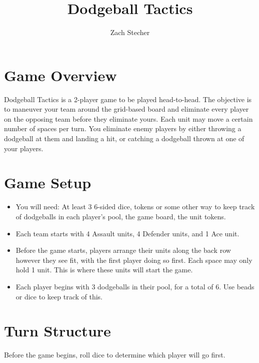 \documentclass[10pt]{article}
\title {Dodgeball Tactics}
\author {Zach Stecher}
\begin{document}
\maketitle

\section*{Game Overview}
Dodgeball Tactics is a 2-player game to be played head-to-head. The objective is to maneuver your team around the grid-based board and eliminate every player on the opposing team before they eliminate yours. Each unit may move a certain number of spaces per turn. You eliminate enemy players by either throwing a dodgeball at them and landing a hit, or catching a dodgeball thrown at one of your players.

\section*{Game Setup}
\begin{itemize}
\item You will need: At least 3 6-sided dice, tokens or some other way to keep track of dodgeballs in each player's pool, the game board, the unit tokens.
\item Each team starts with 4 Assault units, 4 Defender units, and 1 Ace unit.
\item Before the game starts, players arrange their units along the back row however they see fit, with the first player doing so first. Each space may only hold 1 unit. This is where these units will start the game.
\item Each player begins with 3 dodgeballs in their pool, for a total of 6. Use beads or dice to keep track of this.
\end{itemize}

\section*{Turn Structure}
Before the game begins, roll dice to determine which player will go first.
\end{document}
